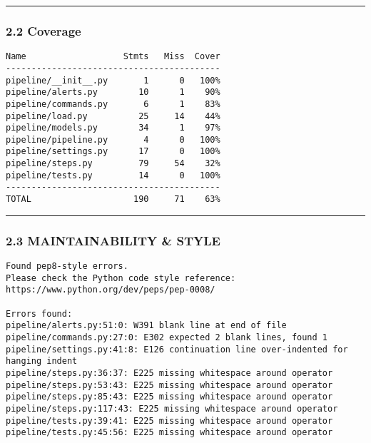 \begin{center}\rule{0.5\linewidth}{\linethickness}\end{center}

\subsubsection{2.2 Coverage}\label{coverage}

\begin{verbatim}
Name                   Stmts   Miss  Cover
------------------------------------------
pipeline/__init__.py       1      0   100%
pipeline/alerts.py        10      1    90%
pipeline/commands.py       6      1    83%
pipeline/load.py          25     14    44%
pipeline/models.py        34      1    97%
pipeline/pipeline.py       4      0   100%
pipeline/settings.py      17      0   100%
pipeline/steps.py         79     54    32%
pipeline/tests.py         14      0   100%
------------------------------------------
TOTAL                    190     71    63%
\end{verbatim}

\begin{center}\rule{0.5\linewidth}{\linethickness}\end{center}

\subsubsection{2.3 MAINTAINABILITY \&
STYLE}\label{maintainability-style}

\begin{verbatim}
Found pep8-style errors.
Please check the Python code style reference: https://www.python.org/dev/peps/pep-0008/

Errors found:
pipeline/alerts.py:51:0: W391 blank line at end of file
pipeline/commands.py:27:0: E302 expected 2 blank lines, found 1
pipeline/settings.py:41:8: E126 continuation line over-indented for hanging indent
pipeline/steps.py:36:37: E225 missing whitespace around operator
pipeline/steps.py:53:43: E225 missing whitespace around operator
pipeline/steps.py:85:43: E225 missing whitespace around operator
pipeline/steps.py:117:43: E225 missing whitespace around operator
pipeline/tests.py:39:41: E225 missing whitespace around operator
pipeline/tests.py:45:56: E225 missing whitespace around operator
\end{verbatim}
